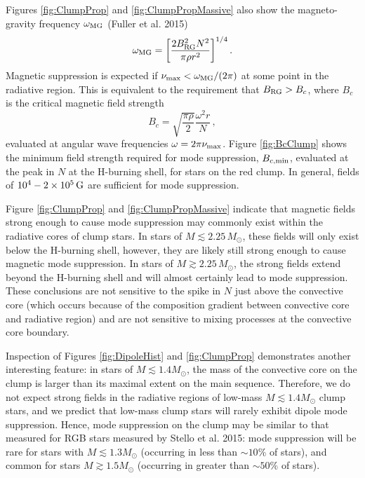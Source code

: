 Figures \ref{fig:ClumpProp} and \ref{fig:ClumpPropMassive} also show the magneto-gravity frequency $\omega_{\rm MG}$ (Fuller et al. 2015)
\begin{equation}
\label{eqn:omegaMG}
\omega_{\rm MG} = \bigg[ \frac{ 2 B_{\rm RG}^2 N^2}{\pi \rho r^2} \bigg]^{1/4} \, .
\end{equation}
Magnetic suppression is expected if $\nu_{\rm max} < \omega_{\rm MG}/(2 \pi)$ at some point in the radiative region. This is equivalent to the requirement that $B_{\rm RG} > B_c$, where $B_c$ is the critical magnetic field strength
\begin{equation}
\label{eqn:Bc}
B_c = \sqrt{ \frac{ \pi \rho}{2} } \frac{\omega^2 r}{N} \, ,
\end{equation}
evaluated at angular wave frequencies $\omega = 2 \pi \nu_{\rm max}$. Figure \ref{fig:BcClump} shows the minimum field strength required for mode suppression, $B_{c,{\rm min}}$, evaluated at the peak in $N$ at the H-burning shell, for stars on the red clump. In general, fields of $10^4-2 \times 10^5 \, {\rm G}$ are sufficient for mode suppression. 

Figure \ref{fig:ClumpProp} and \ref{fig:ClumpPropMassive} indicate that magnetic fields strong enough to cause mode suppression may commonly exist within the radiative cores of clump stars. In stars of $M \lesssim 2.25 \, M_\odot$, these fields will only exist below the H-burning shell, however, they are likely still strong enough to cause magnetic mode suppression. In stars of $M \gtrsim 2.25 \, M_\odot$, the strong fields extend beyond the H-burning shell and will almost certainly lead to mode suppression. These conclusions are not sensitive to the spike in $N$ just above the convective core (which occurs because of the composition gradient between convective core and radiative region) and are not sensitive to mixing processes at the convective core boundary. 

Inspection of Figures \ref{fig:DipoleHist} and \ref{fig:ClumpProp} demonstrates another interesting feature: in stars of $M \lesssim 1.4 M_\odot$, the mass of the convective core on the clump is larger than its maximal extent on the main sequence. Therefore, we do not expect strong fields in the radiative regions of low-mass $M \lesssim 1.4 M_\odot$ clump stars, and we predict that low-mass clump stars will rarely exhibit dipole mode suppression. Hence, mode suppression on the clump may be similar to that measured for RGB stars measured by Stello et al. 2015: mode suppression will be rare for stars with $M \lesssim 1.3 M_\odot$ (occurring in less than $\sim \! 10 \%$ of stars), and common for stars $M \gtrsim 1.5 M_\odot$ (occurring in greater than $\sim \! 50 \%$ of stars). 


    
  
  
  
  
  